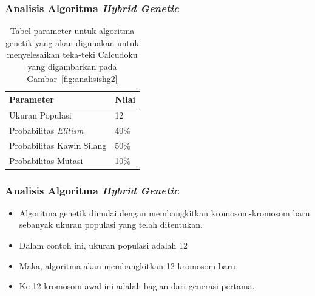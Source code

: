 \documentclass{beamer}
\begin{document}
\begin{frame}
\frametitle{Analisis Algoritma \textit{Hybrid Genetic}}
\begin{table}
\centering
\captionsetup{justification=centering}
\begin{tabular}{| l | l |}
\hline
Parameter & Nilai \\
\hline \hline
Ukuran Populasi & 12 \\
\hline
Probabilitas \textit{Elitism} & 40\% \\
\hline
Probabilitas Kawin Silang & 50\% \\
\hline
Probabilitas Mutasi & 10\% \\
\hline
\end{tabular}
\caption[Tabel parameter untuk algoritma genetik yang akan digunakan untuk menyelesaikan teka-teki Calcudoku yang digambarkan pada Gambar~\ref{fig:analisishg2}]{Tabel parameter untuk algoritma genetik yang akan digunakan untuk menyelesaikan teka-teki Calcudoku yang digambarkan pada Gambar~\ref{fig:analisishg2}}
\label{tab:analisishg1}
\end{table}
\end{frame}

\note{

}

\begin{frame}
\frametitle{Analisis Algoritma \textit{Hybrid Genetic}}
\begin{itemize}
\item Algoritma genetik dimulai dengan membangkitkan kromosom-kromosom baru sebanyak ukuran populasi yang telah ditentukan.
\item Dalam contoh ini, ukuran populasi adalah 12
\item Maka, algoritma akan membangkitkan 12 kromosom baru
\item Ke-12 kromosom awal ini adalah bagian dari generasi pertama.
\end{itemize}
\end{frame}

\end{document}

